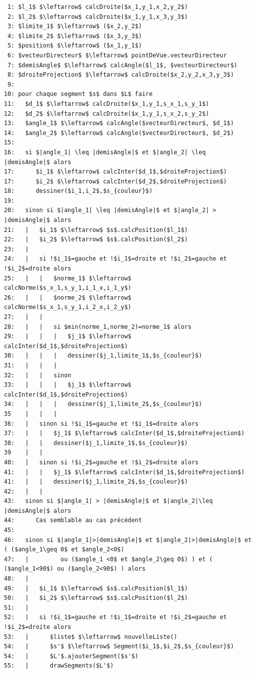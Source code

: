 \documentclass[11pt,a4paper]{article}
\begin{document}
\newpage

\begin{lstlisting}
 1: $l_1$ $\leftarrow$ calcDroite($x_1,y_1,x_2,y_2$)
 2: $l_2$ $\leftarrow$ calcDroite($x_1,y_1,x_3,y_3$)
 3: $limite_1$ $\leftarrow$ ($x_2,y_2$)
 4: $limite_2$ $\leftarrow$ ($x_3,y_3$)
 5: $position$ $\leftarrow$ ($x_1,y_1$)
 6: $vecteurDirecteur$ $\leftarrow$ pointDeVue.vecteurDirecteur
 7: $demisAngle$ $\leftarrow$ calcAngle($l_1$, $vecteurDirecteur$)
 8: $droiteProjection$ $\leftarrow$ calcDroite($x_2,y_2,x_3,y_3$)
 9: 
10: pour chaque segment $s$ dans $L$ faire
11:   $d_1$ $\leftarrow$ calcDroite($x_1,y_1,s_x_1,s_y_1$)
12:   $d_2$ $\leftarrow$ calcDroite($x_1,y_1,s_x_2,s_y_2$)
13:   $angle_1$ $\leftarrow$ calcAngle($vecteurDirecteur$, $d_1$)
14:   $angle_2$ $\leftarrow$ calcAngle($vecteurDirecteur$, $d_2$)
15:
16:   si $|angle_1| \leq |demisAngle|$ et $|angle_2| \leq |demisAngle|$ alors
17:      $i_1$ $\leftarrow$ calcInter($d_1$,$droiteProjection$)
17:      $i_2$ $\leftarrow$ calcInter($d_2$,$droiteProjection$)
18:      dessiner($i_1,i_2$,$s_{couleur}$)
19:
20:   sinon si $|angle_1| \leq |demisAngle|$ et $|angle_2| > |demisAngle|$ alors
21:   |   $i_1$ $\leftarrow$ $s$.calcPosition($l_1$)
22:   |   $i_2$ $\leftarrow$ $s$.calcPosition($l_2$)
23:   |
24:   |   si !$i_1$=gauche et !$i_1$=droite et !$i_2$=gauche et !$i_2$=droite alors
25:   |   |   $norme_1$ $\leftarrow$ calcNorme($s_x_1,s_y_1,i_1_x,i_1_y$)
26:   |   |   $norme_2$ $\leftarrow$ calcNorme($s_x_1,s_y_1,i_2_x,i_2_y$)
27:   |   |   
28:   |   |   si $min(norme_1,norme_2)=norme_1$ alors
29:   |   |   |   $j_1$ $\leftarrow$ calcInter($d_1$,$droiteProjection$)
30:   |   |   |   dessiner($j_1,limite_1$,$s_{couleur}$)
31:   |   |   |
32:   |   |   sinon
33:   |   |   |   $j_1$ $\leftarrow$ calcInter($d_1$,$droiteProjection$)
34:   |   |   |   dessiner($j_1,limite_2$,$s_{couleur}$)
35    |   |   |
36:   |   sinon si !$i_1$=gauche et !$i_1$=droite alors
37:   |   |   $j_1$ $\leftarrow$ calcInter($d_1$,$droiteProjection$)
38:   |   |   dessiner($j_1,limite_1$,$s_{couleur}$)
39    |   |
40:   |   sinon si !$i_2$=gauche et !$i_2$=droite alors
41:   |   |   $j_1$ $\leftarrow$ calcInter($d_1$,$droiteProjection$)
41:   |   |   dessiner($j_1,limite_2$,$s_{couleur}$)
42:   |   |
43:   sinon si $|angle_1| > |demisAngle|$ et $|angle_2|\leq |demisAngle|$ alors
44:      Cas semblable au cas précédent
45:
46:   sinon si $|angle_1|>|demisAngle|$ et $|angle_2|>|demisAngle|$ et ( ($angle_1\geq 0$ et $angle_2<0$)
47:   |         ou ($angle_1 <0$ et $angle_2\geq 0$) ) et ( ($angle_1<90$) ou ($angle_2<90$) ) alors
48:   |
49:   |   $i_1$ $\leftarrow$ $s$.calcPosition($l_1$)
50:   |   $i_2$ $\leftarrow$ $s$.calcPosition($l_2$)
51:   |
52:   |   si !$i_1$=gauche et !$i_1$=droite et !$i_2$=gauche et !$i_2$=droite alors
53:   |      $liste$ $\leftarrow$ nouvelleListe()
54:   |      $s'$ $\leftarrow$ Segment($i_1$,$i_2$,$s_{couleur}$)
54:   |      $L'$.ajouterSegment($s'$)
55:   |      drawSegments($L'$)
\end{lstlisting}
\restoregeometry
\end{document}
